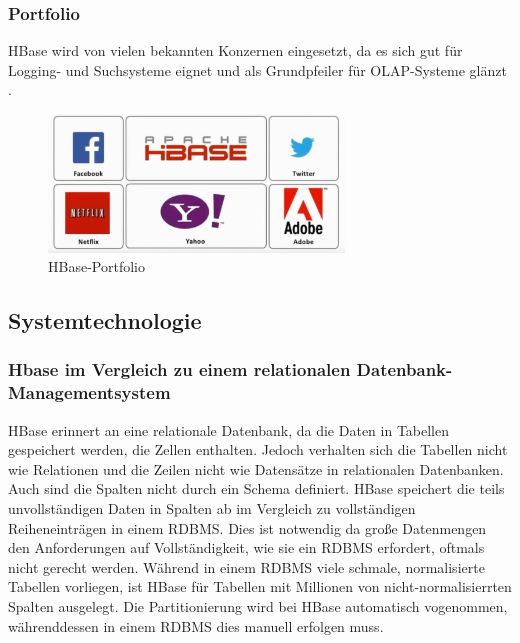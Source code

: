 

\subsubsection{Portfolio}
HBase wird von vielen bekannten Konzernen eingesetzt, da es sich gut für Logging- und Suchsysteme  eignet und als Grundpfeiler für \ac{OLAP}-Systeme glänzt \cite{Redt01}.

\begin{figure}[htbp] 
  \centering
     \includegraphics[width=0.7\textwidth]{images/portfolio.png}
  \caption{HBase-Portfolio}
  \label{fig:Portfolio}
\end{figure}

\subsection{Systemtechnologie} %

\subsubsection{Hbase im Vergleich zu einem relationalen Datenbank-Managementsystem}
HBase erinnert an eine relationale Datenbank, da die Daten in Tabellen gespeichert werden, die Zellen enthalten. Jedoch verhalten sich die Tabellen nicht wie Relationen und die Zeilen nicht wie Datensätze in relationalen Datenbanken. Auch sind die Spalten nicht durch ein Schema definiert.
HBase speichert die teils unvollständigen Daten in Spalten ab im Vergleich zu vollständigen Reiheneinträgen in einem RDBMS. Dies ist notwendig da große Datenmengen den Anforderungen auf Vollständigkeit, wie sie ein RDBMS erfordert, oftmals nicht gerecht werden.  
Während in einem RDBMS viele schmale, normalisierte Tabellen vorliegen, ist HBase für Tabellen mit Millionen von nicht-normalisierrten Spalten ausgelegt. Die Partitionierung wird bei HBase automatisch vogenommen, währenddessen in einem RDBMS dies manuell erfolgen muss.


